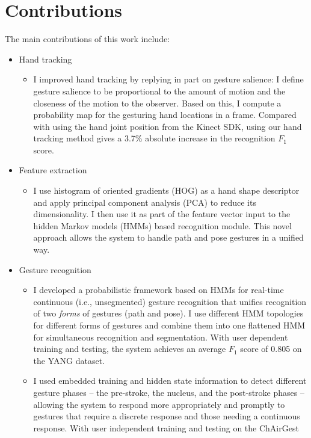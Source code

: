 \section{Contributions}
The main contributions of this work include:
\begin{itemize}
 \item Hand tracking
  \begin{itemize}
  \item I improved hand tracking by replying in part on gesture salience: I
  define gesture salience to be proportional to the amount of motion and the closeness
  of the motion to the observer. Based on this, I compute a probability map for
  the gesturing hand locations in a frame.  Compared with using the hand joint
  position from the Kinect SDK, using our hand tracking method gives a 3.7\%
  absolute increase in the recognition $F_1$ score.
  \end{itemize}
 \item Feature extraction
  \begin{itemize}
  \item I use histogram of oriented gradients (HOG) as a hand shape descriptor
  and apply principal component analysis (PCA) to reduce its dimensionality. I
  then use it as part of the feature vector input to the hidden Markov models
  (HMMs) based recognition module. This novel approach allows the system to
  handle path and pose gestures in a unified way.
  \end{itemize}
  \item Gesture recognition
    \begin{itemize}
    \item I developed a probabilistic framework based on HMMs for real-time
    continuous (i.e., unsegmented) gesture recognition that unifies recognition
    of two \textit{forms} of gestures (path and pose). I use different HMM
    topologies for different forms of gestures and combine them into one
    flattened HMM for simultaneous recognition and segmentation.  With user dependent
    training and testing, the system achieves an average $F_1$ score of 0.805
    on the YANG dataset.
    \item I used embedded training and hidden state information to detect
    different gesture phases -- the pre-stroke, the nucleus, and the post-stroke
    phases -- allowing the system to respond more appropriately and promptly to
    gestures that require a discrete response and those needing a continuous
    response. With user independent training and testing on the ChAirGest

\end{itemize}
\end{itemize}
